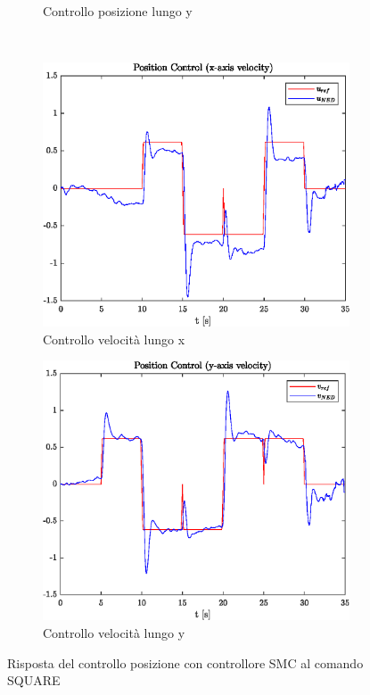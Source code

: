 \begin{figure}
\begin{subfigure}{0.45\textwidth}
		\caption{Controllo posizione lungo y}
	\end{subfigure}
	\\
	\begin{subfigure}{0.45\textwidth}
		\centering
		\includegraphics[width=1\textwidth]{Simulazioni/Figure/SMC/SQUARE/PositionControlXVel}
		\caption{Controllo velocità lungo x}
	\end{subfigure}
	\hfill
	\begin{subfigure}{0.45\textwidth}
		\centering
		\includegraphics[width=1\textwidth]{Simulazioni/Figure/SMC/SQUARE/PositionControlYVel}
		\caption{Controllo velocità lungo y}
	\end{subfigure}
	\caption{Risposta del controllo posizione con controllore SMC al comando SQUARE}
\end{figure}

